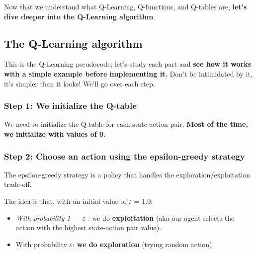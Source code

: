 \documentclass[11pt,a4paper]{article}
\begin{document}
Now that we understand what Q-Learning, Q-functions, and Q-tables are, \textbf{let's dive deeper into the Q-Learning algorithm}.

\subsection{The Q-Learning algorithm}\label{the-q-learning-algorithm}

This is the Q-Learning pseudocode; let's study each part and \textbf{see how it works with a simple example before implementing it.} Don't be intimidated by it, it's simpler than it looks! We'll go over each step.


\subsubsection{Step 1: We initialize the Q-table}\label{step-1-we-initialize-the-q-table}


We need to initialize the Q-table for each state-action pair. \textbf{Most of the time, we initialize with values of 0.}

\subsubsection{Step 2: Choose an action using the epsilon-greedy strategy}\label{step-2-choose-an-action-using-the-epsilon-greedy-strategy}


The epsilon-greedy strategy is a policy that handles the exploration/exploitation trade-off.

The idea is that, with an initial value of \(\varepsilon\) = 1.0:

\begin{itemize}
\tightlist
\item
  \emph{With probability 1 --- \(\varepsilon\)} : we do \textbf{exploitation} (aka our agent selects the action with the highest state-action pair value).
\item
  With probability \(\varepsilon\): \textbf{we do exploration} (trying random action).
\end{itemize}
\end{document}
